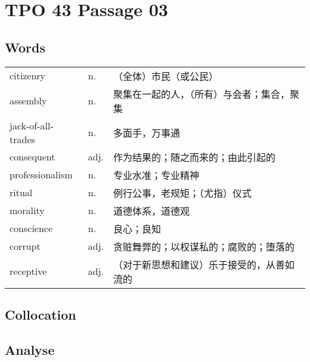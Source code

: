 \section{TPO 43 Passage 03}

\subsection{Words}

\begin{tabular}{lll}
    citizenry          & n.   & （全体）市民（或公民）           \\
    assembly           & n.   & 聚集在一起的人，（所有）与会者；集合，聚集 \\
    jack-of-all-trades & n.   & 多面手，万事通               \\
    consequent         & adj. & 作为结果的；随之而来的；由此引起的     \\
    professionalism    & n.   & 专业水准；专业精神             \\
    ritual             & n.   & 例行公事，老规矩；（尤指）仪式       \\
    morality           & n.   & 道德体系，道德观              \\
    conscience         & n.   & 良心；良知                 \\
    corrupt            & adj. & 贪赃舞弊的；以权谋私的；腐败的；堕落的   \\
    receptive          & adj. & （对于新思想和建议）乐于接受的，从善如流的 \\
\end{tabular}

\subsection{Collocation}


\subsection{Analyse}

